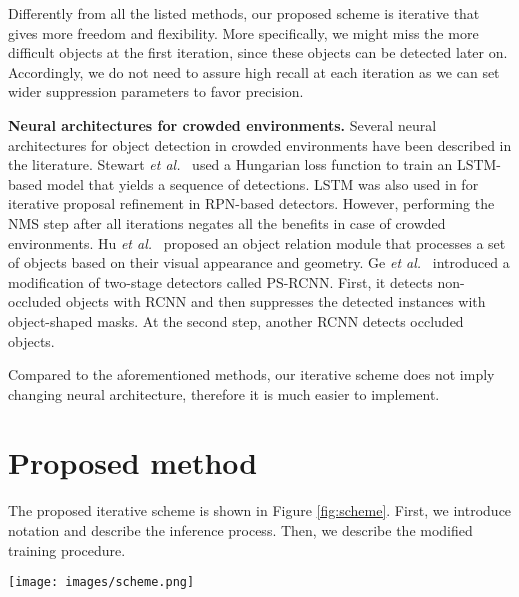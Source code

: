 \documentclass[runningheads]{llncs}
\newcommand{\etal}{\emph{et al.}\ }
\begin{document}
Differently from all the listed methods, our proposed scheme is iterative that gives more freedom and flexibility. More specifically, we might miss the more difficult objects at the first iteration, since these objects can be detected later on. Accordingly, we do not need to assure high recall at each iteration as we can set wider suppression parameters to favor precision.

\textbf{Neural architectures for crowded environments.}
Several neural architectures for object detection in crowded environments have been described in the literature. Stewart \etal \cite{stewart2016end} used a Hungarian loss function to train an LSTM-based model that yields a sequence of detections. LSTM was also used in \cite{gong2019improving} for iterative proposal refinement in RPN-based detectors. However, performing the NMS step after all iterations negates all the benefits in case of crowded environments. Hu \etal \cite{hu2018relation} proposed an object relation module that processes a set of objects based on their visual appearance and geometry. Ge \etal \cite{ge2020ps} introduced a modification of two-stage detectors called PS-RCNN. First, it detects non-occluded objects with RCNN and then suppresses the detected instances with object-shaped masks. At the second step, another RCNN detects occluded objects.

Compared to the aforementioned methods, our iterative scheme does not imply changing neural architecture, therefore it is much easier to implement.

\section{Proposed method}
\label{sec:method}

The proposed iterative scheme is shown in Figure \ref{fig:scheme}. First, we introduce notation and describe the inference process. Then, we describe the modified training procedure.

\begin{figure*}[ht]
    \centering
        \texttt{[image: images/scheme.png]}
    \caption{Proposed iterative scheme. The unchanged meta-architecture of an arbitrary detector is marked with blue. The single convolution layer for the history map is marked green. Out of the 4 overlapping objects in the image, 2 are in the history, where they were either randomly sampled at the training step, or detected during previous iterations of the inference. The remaining 2 are predicted by the detector.}
    \label{fig:scheme}
\end{figure*}
\end{document}
